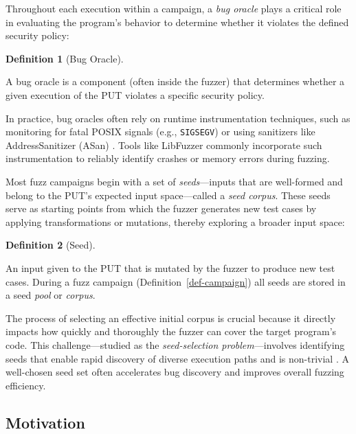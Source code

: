 \documentclass[
  a4paper,
]{scrreprt}
\theoremstyle{definition}
\newtheorem{definition}{Definition}[chapter]
\theoremstyle{remark}
\begin{document}
Throughout each execution within a campaign, a \emph{bug oracle} plays a
critical role in evaluating the program's behavior to determine whether
it violates the defined security policy:

\begin{definition}[Bug
Oracle]\protect\hypertarget{def-oracle}{}\label{def-oracle}

A bug oracle is a component (often inside the fuzzer) that determines
whether a given execution of the PUT violates a specific security
policy.

\end{definition}

In practice, bug oracles often rely on runtime instrumentation
techniques, such as monitoring for fatal POSIX signals (e.g.,
\texttt{SIGSEGV}) or using sanitizers like AddressSanitizer (ASan)
\autocite{serebryany2012}. Tools like LibFuzzer \autocite{libfuzzer}
commonly incorporate such instrumentation to reliably identify crashes
or memory errors during fuzzing.

Most fuzz campaigns begin with a set of \emph{seeds}---inputs that are
well-formed and belong to the PUT's expected input space---called a
\emph{seed corpus}. These seeds serve as starting points from which the
fuzzer generates new test cases by applying transformations or
mutations, thereby exploring a broader input space:

\begin{definition}[Seed]\protect\hypertarget{def-seed}{}\label{def-seed}

An input given to the PUT that is mutated by the fuzzer to produce new
test cases. During a fuzz campaign (Definition~\ref{def-campaign}) all
seeds are stored in a seed \emph{pool} or \emph{corpus}.

\end{definition}

The process of selecting an effective initial corpus is crucial because
it directly impacts how quickly and thoroughly the fuzzer can cover the
target program's code. This challenge---studied as the
\emph{seed-selection problem}---involves identifying seeds that enable
rapid discovery of diverse execution paths and is non-trivial
\autocite{rebert2014}. A well-chosen seed set often accelerates bug
discovery and improves overall fuzzing efficiency.

\subsection{Motivation}\label{motivation}
\end{document}

